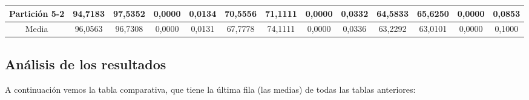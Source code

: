 \documentclass[12pt]{article}
\begin{document}
\begin{table}[H]
{\begin{tabular}{|c|cccc|cccc|cccc|}
Partición 5-2 & \multicolumn{1}{c|}{94,7183}                                                  & \multicolumn{1}{c|}{97,5352}                                                 & \multicolumn{1}{c|}{0,0000}  & 0,0134 & \multicolumn{1}{c|}{70,5556}                                                  & \multicolumn{1}{c|}{71,1111}                                                 & \multicolumn{1}{c|}{0,0000}  & 0,0332 & \multicolumn{1}{c|}{64,5833}                                                  & \multicolumn{1}{c|}{65,6250}                                                 & \multicolumn{1}{c|}{0,0000}  & 0,0853 \\ \hline
Media         & \multicolumn{1}{c|}{96,0563}                                                  & \multicolumn{1}{c|}{96,7308}                                                 & \multicolumn{1}{c|}{0,0000}  & 0,0131 & \multicolumn{1}{c|}{67,7778}                                                  & \multicolumn{1}{c|}{74,1111}                                                 & \multicolumn{1}{c|}{0,0000}  & 0,0336 & \multicolumn{1}{c|}{63,2292}                                                  & \multicolumn{1}{c|}{63,0101}                                                 & \multicolumn{1}{c|}{0,0000}  & 0,1000 \\ \hline
\end{tabular}}
\end{table}


\subsection{Análisis de los resultados}

A continuación vemos la tabla comparativa, que tiene la última fila (las medias) de todas las tablas anteriores:
\end{document}

